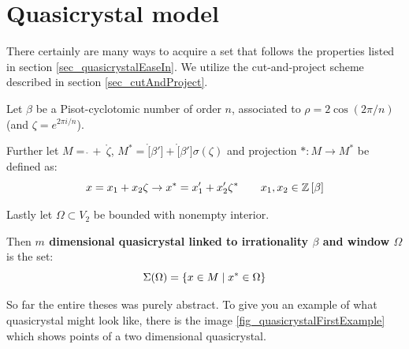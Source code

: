 \documentclass[text.tex]{subfiles}
\begin{document}
\section{Quasicrystal model}%
There certainly are many ways to acquire a set that follows the properties listed in section \ref{sec_quasicrystalEaseIn}. We utilize the cut-and-project scheme described in section \ref{sec_cutAndProject}. 



\begin{definition}\label{def_quasicrystal}
Let $\beta$ be a Pisot-cyclotomic number of order $n$, associated to $\rho = 2\cos\left(2\pi/n\right)$ (and $\zeta = e^{2\pi i/n}$). 

Further let $M=\ring~+~\ring\zeta$, $M^\ast=\ring[\beta']+\ring[\beta']\sigma(\zeta)$ and projection $\ast:M\rightarrow M^\ast$ be defined as: 
$$x=x_1+x_2\zeta \rightarrow x^\ast = x_1'+x_2'\zeta^\ast \qquad x_1, x_2\in\mathbb{Z}\left[\beta\right]$$

Lastly let $\Omega\subset V_2$ be bounded with nonempty interior. 

Then \textbf{$m$ dimensional quasicrystal linked to irrationality $\beta$ and window $\Omega$} is the set:
$$\Sigma(\Omega) = \{ x \in M\; |\; x^\ast\in \Omega\}$$
\end{definition}

So far the entire theses was purely abstract. To give you an example of what quasicrystal might look like, there is the image \ref{fig_quasicrystalFirstExample} which shows points of a two dimensional quasicrystal.
\end{document}

